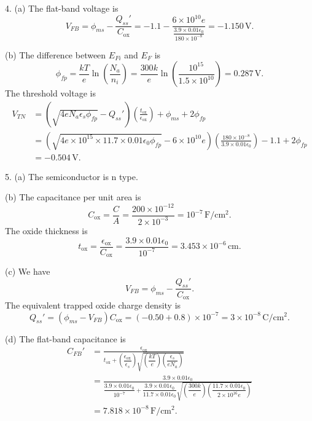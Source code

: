\documentclass[a4paper]{article}
\begin{document}
4. (a) The flat-band voltage is
\[V_{FB}=\phi_{ms}-\frac{Q_{ss}'}{C_\text{ox}}=-1.1-\frac{6\times10^{10}e}{\frac{3.9\times0.01\epsilon_0}{180\times10^{-8}}}=-1.150\,\text{V}.\]

(b) The difference between $E_{Fi}$ and $E_F$ is
\[\phi_{fp}=\frac{kT}{e}\ln{\left(\frac{N_a}{n_i}\right)}=\frac{300k}{e}\ln{\left(\frac{10^{15}}{1.5\times10^{10}}\right)}=0.287\,\text{V}.\]
The threshold voltage is
\[
    \begin{aligned}
        V_{TN}&=(\sqrt{4eN_a\epsilon_s\phi_{fp}}-Q_{ss}')\left(\frac{t_\text{ox}}{\epsilon_\text{ox}}\right)+\phi_{ms}+2\phi_{fp}\\
        &=(\sqrt{4e\times10^{15}\times11.7\times0.01\epsilon_0\phi_{fp}}-6\times10^{10}e)\left(\frac{180\times10^{-8}}{3.9\times0.01\epsilon_0}\right)-1.1+2\phi_{fp}\\
        &=-0.504\,\text{V}.
    \end{aligned}
\]

5. (a) The semiconductor is n type.

(b) The capacitance per unit area is
\[C_\text{ox}=\frac{C}{A}=\frac{200\times10^{-12}}{2\times10^{-3}}=10^{-7}\,\mathrm{F/cm^2}.\]
The oxide thickness is
\[t_\text{ox}=\frac{\epsilon_\text{ox}}{C_\text{ox}}=\frac{3.9\times0.01\epsilon_0}{10^{-7}}=3.453\times10^{-6}\,\text{cm}.\]

(c) We have
\[V_{FB}=\phi_{ms}-\frac{Q_{ss}'}{C_\text{ox}}.\]
The equivalent trapped oxide charge density is
\[Q_{ss}'=(\phi_{ms}-V_{FB})C_\text{ox}=(-0.50+0.8)\times10^{-7}=3\times10^{-8}\,\mathrm{C/cm^2}.\]

(d) The flat-band capacitance is
\[
    \begin{aligned}
        C_{FB}'&=\frac{\epsilon_\text{ox}}{t_\text{ox}+\left(\dfrac{\epsilon_\text{ox}}{\epsilon_s}\right)\sqrt{\left(\dfrac{kT}{e}\right)\left(\dfrac{\epsilon_s}{eN_a}\right)}}\\
        &=\frac{3.9\times0.01\epsilon_0}{\dfrac{3.9\times0.01\epsilon_0}{10^{-7}}+\dfrac{3.9\times0.01\epsilon_0}{11.7\times0.01\epsilon_0}\sqrt{\left(\dfrac{300k}{e}\right)\left(\dfrac{11.7\times0.01\epsilon_0}{2\times10^{16}e}\right)}}\\
        &=7.818\times10^{-8}\,\mathrm{F/cm^2}.
    \end{aligned}
\]
\end{document}
